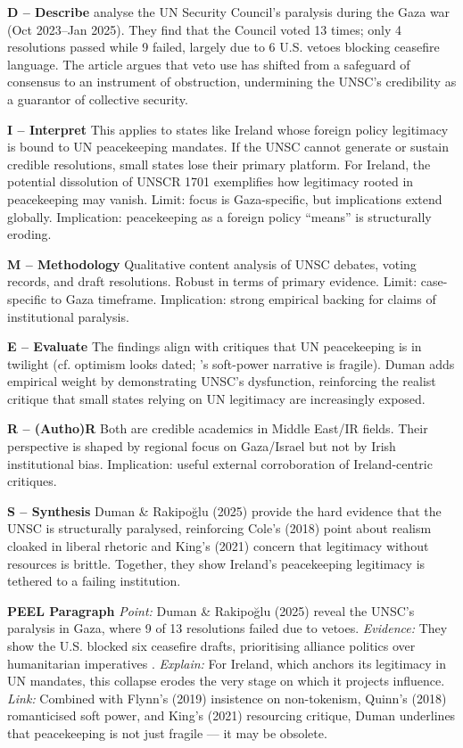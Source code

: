 \textbf{D – Describe}  
\parencite{DUMAN_2025} analyse the UN Security Council’s paralysis during the Gaza war (Oct 2023–Jan 2025). They find that the Council voted 13 times; only 4 resolutions passed while 9 failed, largely due to 6 U.S. vetoes blocking ceasefire language. The article argues that veto use has shifted from a safeguard of consensus to an instrument of obstruction, undermining the UNSC’s credibility as a guarantor of collective security.  

\textbf{I – Interpret}  
This applies to states like Ireland whose foreign policy legitimacy is bound to UN peacekeeping mandates. If the UNSC cannot generate or sustain credible resolutions, small states lose their primary platform. For Ireland, the potential dissolution of UNSCR 1701 exemplifies how legitimacy rooted in peacekeeping may vanish. Limit: focus is Gaza-specific, but implications extend globally. Implication: peacekeeping as a foreign policy “means” is structurally eroding.  

\textbf{M – Methodology}  
Qualitative content analysis of UNSC debates, voting records, and draft resolutions. Robust in terms of primary evidence. Limit: case-specific to Gaza timeframe. Implication: strong empirical backing for claims of institutional paralysis.  

\textbf{E – Evaluate}  
The findings align with critiques that UN peacekeeping is in twilight (cf. \parencite{FLYNN_2019} optimism looks dated; \parencite{QUINN_2018}’s soft-power narrative is fragile). Duman adds empirical weight by demonstrating UNSC’s dysfunction, reinforcing the realist critique that small states relying on UN legitimacy are increasingly exposed.  

\textbf{R – (Autho)R}  
Both are credible academics in Middle East/IR fields. Their perspective is shaped by regional focus on Gaza/Israel but not by Irish institutional bias. Implication: useful external corroboration of Ireland-centric critiques.  

\textbf{S – Synthesis}  
Duman \& Rakipo\u{g}lu (2025) provide the hard evidence that the UNSC is structurally paralysed, reinforcing Cole’s (2018) point about realism cloaked in liberal rhetoric and King’s (2021) concern that legitimacy without resources is brittle. Together, they show Ireland’s peacekeeping legitimacy is tethered to a failing institution.  

\textbf{PEEL Paragraph}  
\textit{Point:} Duman \& Rakipo\u{g}lu (2025) reveal the UNSC’s paralysis in Gaza, where 9 of 13 resolutions failed due to vetoes.  
\textit{Evidence:} They show the U.S. blocked six ceasefire drafts, prioritising alliance politics over humanitarian imperatives \parencite{DUMAN_2025}.  
\textit{Explain:} For Ireland, which anchors its legitimacy in UN mandates, this collapse erodes the very stage on which it projects influence.  
\textit{Link:} Combined with Flynn’s (2019) insistence on non-tokenism, Quinn’s (2018) romanticised soft power, and King’s (2021) resourcing critique, Duman underlines that peacekeeping is not just fragile — it may be obsolete.  

